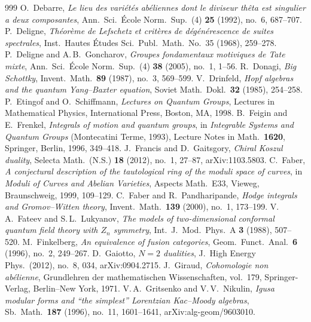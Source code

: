 \begin{thebibliography}{999}
 O.~Debarre, \emph{Le lieu des vari\'et\'es ab\'eliennes dont le diviseur th\^eta est singulier a deux composantes}, Ann.\ Sci.\ \'Ecole Norm.\ Sup.\ (4) \textbf{25} (1992), no.~6, 687--707.
 P.~Deligne, \emph{Th\'eor\`eme de Lefschetz et crit\`eres de d\'eg\'en\'erescence de suites spectrales}, Inst.\ Hautes \'Etudes Sci.\ Publ.\ Math.\ No.~35 (1968), 259--278.
 P.~Deligne and A.\,B.~Goncharov, \emph{Groupes fondamentaux motiviques de Tate mixte}, Ann.\ Sci.\ \'Ecole Norm.\ Sup.\ (4) \textbf{38} (2005), no.~1, 1--56.
 R.~Donagi, \emph{Big Schottky}, Invent.\ Math.\ \textbf{89} (1987), no.~3, 569--599.
 V.~Drinfeld, \emph{Hopf algebras and the quantum Yang--Baxter equation}, Soviet Math.\ Dokl.\ \textbf{32} (1985), 254--258. %
 P.~Etingof and O.~Schiffmann, \emph{Lectures on Quantum Groups}, Lectures in Mathematical Physics, International Press, Boston, MA, 1998. %
 B.~Feigin and E.~Frenkel, \emph{Integrals of motion and quantum groups}, in \emph{Integrable Systems and Quantum Groups} (Montecatini Terme, 1993), Lecture Notes in Math.\ \textbf{1620}, Springer, Berlin, 1996, 349--418.
 J.~Francis and D.~Gaitsgory, \emph{Chiral Koszul duality}, Selecta Math.\ (N.S.) \textbf{18} (2012), no.~1, 27--87, arXiv:1103.5803. %
 C.~Faber, \emph{A conjectural description of the tautological ring of the moduli space of curves}, in \emph{Moduli of Curves and Abelian Varieties}, Aspects Math.\ E33, Vieweg, Braunschweig, 1999, 109--129.
 C.~Faber and R.~Pandharipande, \emph{Hodge integrals and Gromov--Witten theory}, Invent.\ Math.\ \textbf{139} (2000), no.~1, 173--199. %
 V.\,A.~Fateev and S.\,L.~Lukyanov, \emph{The models of two-dimensional conformal quantum field theory with $Z_n$ symmetry}, Int.\ J.\ Mod.\ Phys.\ A \textbf{3} (1988), 507--520. %
 M.~Finkelberg, \emph{An equivalence of fusion categories}, Geom.\ Funct.\ Anal.\ \textbf{6} (1996), no.~2, 249--267. %
 D.~Gaiotto, \emph{$N{=}2$ dualities}, J.~High Energy Phys.\ (2012), no.~8, 034, arXiv:0904.2715. %
 J.~Giraud, \emph{Cohomologie non ab\'elienne}, Grundlehren der mathematischen Wissenschaften, vol.~179, Springer-Verlag, Berlin--New York, 1971.
 V.\,A.~Gritsenko and V.\,V.~Nikulin, \emph{Igusa modular forms and ``the simplest'' Lorentzian Kac--Moody algebras}, Sb.\ Math.\ \textbf{187} (1996), no.~11, 1601--1641, arXiv:alg-geom/9603010. %

\end{thebibliography}
